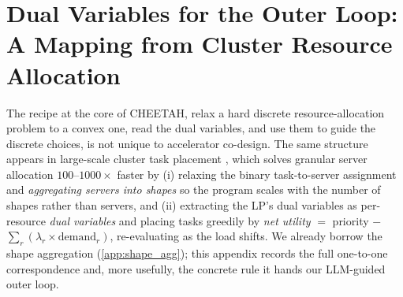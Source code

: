 \section{Dual Variables for the Outer Loop: A Mapping from Cluster Resource Allocation}
\label{app:cvx_mapping}

The recipe at the core of CHEETAH, relax a hard discrete resource-allocation
problem to a convex one, read the dual variables, and use them to
guide the discrete choices, is not unique to accelerator co-design. The same
structure appears in large-scale cluster task placement \citep{cvxcluster2026},
which solves granular server allocation $100$--$1000\times$ faster by (i) relaxing
the binary task-to-server assignment and \emph{aggregating servers into shapes} so
the program scales with the number of shapes rather than servers, and (ii)
extracting the LP's dual variables as per-resource \emph{dual variables} and placing
tasks greedily by \emph{net utility} $=$ priority $-$ $\sum_{r}(\lambda_r
\times \text{demand}_r)$, re-evaluating as the load shifts. We already borrow the shape
aggregation (\cref{app:shape_agg}); this appendix records the full one-to-one
correspondence and, more usefully, the concrete rule it hands our LLM-guided outer
loop.

